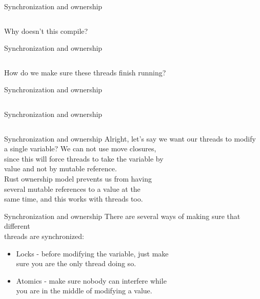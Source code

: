 \documentclass[usenames,dvipsnames,10pt,aspectratio=169]{beamer}
\begin{document}
\begin{frame}{Synchronization and ownership}
	\inputminted[fontsize=\footnotesize]{rust}{code/sync1.rs}
	\vspace{0.3cm}
	Why doesn't this compile?
\end{frame}

\begin{frame}{Synchronization and ownership}
	\inputminted[fontsize=\footnotesize]{rust}{code/sync2.rs}
	\vspace{0.3cm}
	How do we make sure these threads finish running?
\end{frame}

\begin{frame}{Synchronization and ownership}
	\inputminted[fontsize=\scriptsize]{rust}{code/sync3.rs}
	\vspace{0.3cm}
\end{frame}

\begin{frame}{Synchronization and ownership}
	\inputminted[fontsize=\scriptsize]{rust}{code/sync4.rs}
	\vspace{0.3cm}
\end{frame}

\begin{frame}{Synchronization and ownership}
	Alright, let's say we want our threads to modify\\
	a single variable? We can not use \textcolor{ucuyellow}{move} closures,\\
	since this will force threads to take the variable by\\
	value and not by mutable reference.\\
	\vspace{0.3cm}
	Rust ownership model prevents us from having\\
	several mutable references to a value at the\\
	same time, and this works with threads too.
\end{frame}

\begin{frame}{Synchronization and ownership}
	There are several ways of making sure that different\\
	threads are synchronized:

	\vspace{0.3cm}
	\begin{itemize}[label=$\bullet$]
		\item Locks - before modifying the variable, just make\\
			sure you are the only thread doing so.
		\item Atomics - make sure nobody can interfere while\\
			you are in the middle of modifying a value.
	\end{itemize}
\end{frame}
\end{document}
